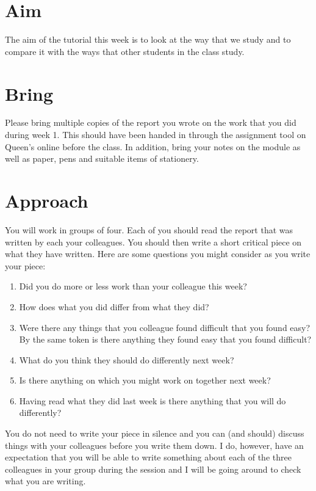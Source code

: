 \documentclass[a4paper]{article}
\begin{document}
\section{Aim}

The aim of the tutorial this week is to look at the way that we study and to compare it with the ways that other students in the class study.

\section{Bring}

Please bring multiple copies of the report you wrote on the work that you did during week 1.  This should have been handed in through the assignment tool on Queen's online before the class.  In 
addition, bring your notes on the module as well as paper, pens and suitable items of stationery.

\section{Approach}

You will work in groups of four.  Each of you should read the report that was written by each your colleagues. You should then write a short critical piece on what they have written.  Here are some 
questions you might consider as you write your piece:

\begin{enumerate}
 \item Did you do more or less work than your colleague this week?
 \item How does what you did differ from what they did?
 \item Were there any things that you colleague found difficult that you found easy?  By the same token is there anything they found easy that you found difficult?
 \item What do you think they should do differently next week?
 \item Is there anything on which you might work on together next week?
 \item Having read what they did last week is there anything that you will do differently?
\end{enumerate}

You do not need to write your piece in silence and you can (and should) discuss things with your colleagues before you write them down.  I do, however, have an expectation that you will be able to 
write something about each of the three colleagues in your group during the session and I will be going around to check what you are writing.
\end{document}
